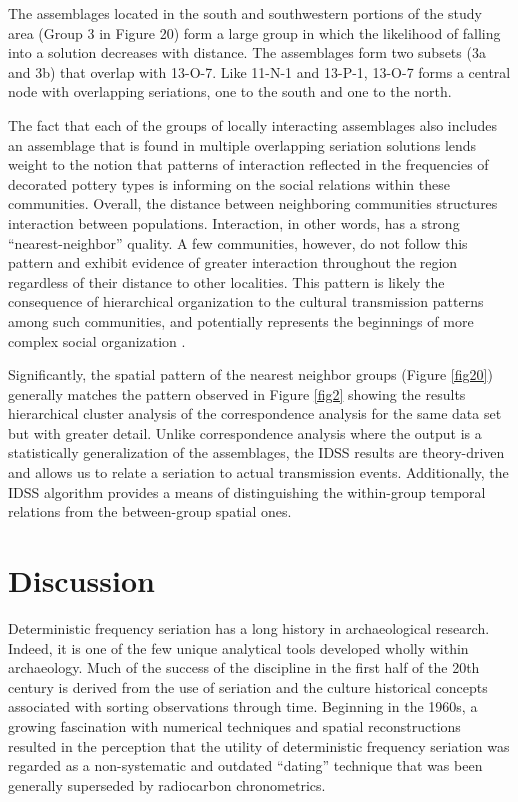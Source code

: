 \documentclass[10pt,letterpaper]{article}
\begin{document}
The assemblages located in the south and southwestern portions of the study area (Group 3 in Figure 20) form a large group in which the likelihood of falling into a solution decreases with distance. The assemblages form two subsets (3a and 3b) that overlap with 13-O-7. Like 11-N-1 and 13-P-1, 13-O-7 forms a central node with overlapping seriations, one to the south and one to the north. 

The fact that each of the groups of locally interacting assemblages also includes an assemblage that is found in multiple overlapping seriation solutions lends weight to the notion that patterns of interaction reflected in the frequencies of decorated pottery types is informing on the social relations within these communities. Overall, the distance between neighboring communities structures interaction between populations. Interaction, in other words, has a strong “nearest-neighbor” quality. A few communities, however, do not follow this pattern and exhibit evidence of greater interaction throughout the region regardless of their distance to other localities. This pattern is likely the consequence of hierarchical organization to the cultural transmission patterns among such communities, and potentially represents the beginnings of more complex social organization \cite{Lipo2001a,Lipo2008}. 

Significantly, the spatial pattern of the nearest neighbor groups (Figure \ref{fig20}) generally matches the pattern observed in Figure \ref{fig2} showing the results hierarchical cluster analysis of the correspondence analysis for the same data set but with greater detail. Unlike correspondence analysis where the output is a statistically generalization of the assemblages, the IDSS results are theory-driven and allows us to relate a seriation to actual transmission events. Additionally, the IDSS algorithm provides a means of distinguishing the within-group temporal relations from the between-group spatial ones.

\section*{Discussion}

Deterministic frequency seriation has a long history in archaeological research. Indeed, it is one of the few unique analytical tools developed wholly within archaeology. Much of the success of the discipline in the first half of the 20th century is derived from the use of seriation and the culture historical concepts associated with sorting observations through time. Beginning in the 1960s, a growing fascination with numerical techniques and spatial reconstructions resulted in the perception that the utility of deterministic frequency seriation was regarded as a non-systematic and outdated ``dating'' technique that was been generally superseded by radiocarbon chronometrics.
\end{document}
